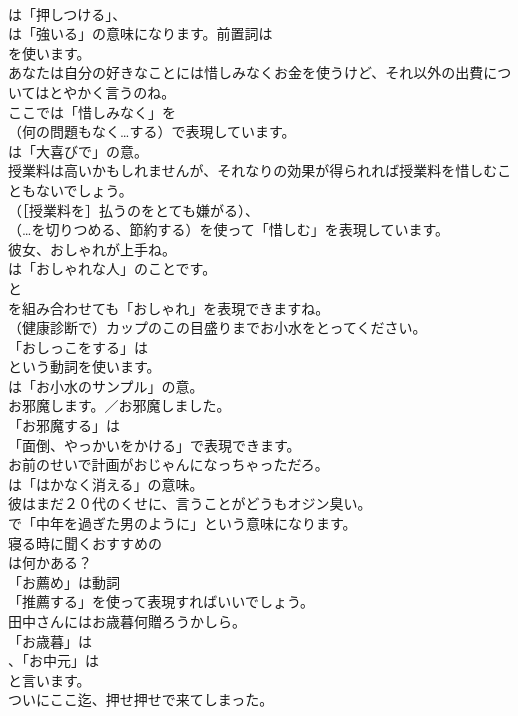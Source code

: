 \documentclass[8pt]{extreport}
\begin{document}
\begin{CJK}{UTF8}{min}
\\	は「押しつける」、
\\	は「強いる」の意味になります。前置詞は
\\	を使います。	
\\	あなたは自分の好きなことには惜しみなくお金を使うけど、それ以外の出費についてはとやかく言うのね。 
\\	ここでは「惜しみなく」を 
\\	（何の問題もなく…する）で表現しています。
\\	は「大喜びで」の意。	
\\	授業料は高いかもしれませんが、それなりの効果が得られれば授業料を惜しむこともないでしょう。 
\\	（［授業料を］払うのをとても嫌がる）、
\\	（…を切りつめる、節約する）を使って「惜しむ」を表現しています。	
\\	彼女、おしゃれが上手ね。 
\\	は「おしゃれな人」のことです。
\\	と 
\\	を組み合わせても「おしゃれ」を表現できますね。	
\\	（健康診断で）カップのこの目盛りまでお小水をとってください。 
\\	「おしっこをする」は
\\	という動詞を使います。
\\	は「お小水のサンプル」の意。	
\\	お邪魔します。／お邪魔しました。 
\\	「お邪魔する」は
\\	「面倒、やっかいをかける」で表現できます。	
\\	お前のせいで計画がおじゃんになっちゃっただろ。 
\\	は「はかなく消える」の意味。	
\\	彼はまだ２０代のくせに、言うことがどうもオジン臭い。 
\\	で「中年を過ぎた男のように」という意味になります。	
\\	寝る時に聞くおすすめの
\\	は何かある？ 
\\	「お薦め」は動詞
\\	「推薦する」を使って表現すればいいでしょう。	
\\	田中さんにはお歳暮何贈ろうかしら。 
\\	「お歳暮」は
\\	、「お中元」は
\\	と言います。	
\\	ついにここ迄、押せ押せで来てしまった。 

\end{CJK}
\end{document}
